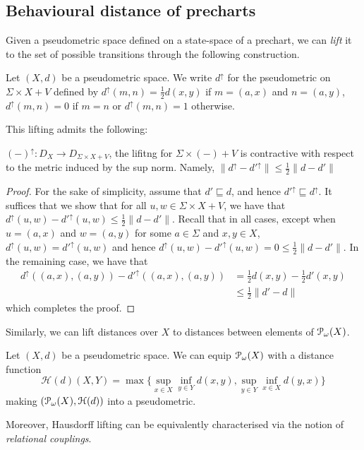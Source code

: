 \subsection{Behavioural distance of precharts}
Given a pseudometric space defined on a state-space of a prechart, we can \emph{lift} it to the set of possible transitions through the following construction.
\begin{definition}\label{def:edge}
	Let $(X,d)$ be a pseudometric space. We write $d^\uparrow$ for the pseudometric on $\Sigma \times X + V$ defined by $d^\uparrow(m, n) = \frac{1}{2} d(x,y)$ if $m = (a,x)$ and $n = (a,y)$, $d^\uparrow(m,n)=0$ if $m = n$ or $d^{\uparrow}(m,n)=1$ otherwise.
\end{definition}
This lifting admits the following:
\begin{lemma}
	$(-)^\uparrow \colon D_X \to D_{\Sigma \times X + V}$, the lifitng for $\Sigma \times (-) + V$ is contractive with respect to the metric induced by the sup norm. Namely,
	$\|d^\uparrow - d'^\uparrow \| \leq \frac{1}{2} \|d - d' \|$ 
\end{lemma}
\begin{proof}
	For the sake of simplicity, assume that $d' \sqsubseteq d$, and hence $d'^\uparrow \sqsubseteq d^\uparrow$. It suffices that we show that for all $u,w \in \Sigma \times X + V$, we have that $ d^\uparrow(u,w) - d'^\uparrow(u,w) \leq \frac{1}{2}\|d-d'\|$. Recall that in all cases, except when $u=(a,x)$ and $w=(a,y)$ for some $a \in \Sigma$ and $x,y \in X$, $d^\uparrow(u,w)=d'^\uparrow(u,w)$ and hence  $d^\uparrow(u,w)-d'^\uparrow(u,w) = 0 \leq \frac{1}{2} \|d - d'\|$. In the remaining case, we have that
	\begin{align*}
		d^\uparrow((a,x),(a,y)) - d'^\uparrow((a,x),(a,y)) &= \frac{1}{2}d(x,y) - \frac{1}{2}d'(x,y) \\
		&\leq \frac{1}{2} \|d'-d\|
	\end{align*}
	which completes the proof.
\end{proof}
Similarly, we can lift distances over $X$ to distances between elements of $\mathcal{P}_\omega (X)$.
\begin{definition}\label{def:hausdorff}
	Let $(X,d)$ be a pseudometric space. We can equip $\mathcal{P}_\omega (X)$ with a distance function $$
	\mathcal{H}(d)(X,Y)= \max \{\sup_{x \in X} \inf_{y \in Y} d(x,y), \sup_{y \in Y} \inf_{x \in X} d(y,x) \}$$ making $(\mathcal{P}_\omega(X), \mathcal{H}(d))$ into a pseudometric.
\end{definition}
Moreover, Hausdorff lifting can be equivalently characterised via the notion of \emph{relational couplings}.
